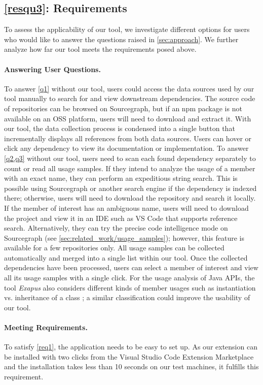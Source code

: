 \documentclass[a4paper,twoside]{article}
\begin{document}
\subsection{\ref{resqu3}: Requirements}
\label{sec:evaluation/resqu3}
To assess the applicability of our tool, we investigate different options for users who would like to answer the questions raised in \cref{sec:approach}.
We further analyze how far our tool meets the requirements posed above.

\paragraph{Answering User Questions.}
To answer \cref{q1} without our tool, users could access the data sources used by our tool manually to search for and view downstream dependencies.
The source code of repositories can be browsed on Sourcegraph, but if an npm package is not available on an OSS platform, users will need to download and extract it.
With our tool, the data collection process is condensed into a single button that incrementally displays all references from both data sources.
Users can hover or click any dependency to view its documentation or implementation.
To answer \cref{q2,q3} without our tool, users need to scan each found dependency separately to count or read all usage samples.
If they intend to analyze the usage of a member with an exact name, they can perform an expeditious string search.
This is possible using Sourcegraph or another search engine if the dependency is indexed there; otherwise, users will need to download the repository and search it locally.
If the member of interest has an ambiguous name, users will need to download the project and view it in an IDE such as VS Code that supports reference search.
Alternatively, they can try the precise code intelligence mode on Sourcegraph (see \cref{sec:related_work/usage_samples}); however, this feature is available for a few repositories only.
All usage samples can be collected automatically and merged into a single list within our tool.
Once the collected dependencies have been processed, users can select a member of interest and view all its usage samples with a single click.
For the usage analysis of Java APIs, the tool \emph{Exapus} also considers different kinds of member usages such as instantiation vs. inheritance of a class \cite{de2013multi}; a similar classification could improve the usability of our tool.

\paragraph{Meeting Requirements.}
To satisfy \cref{req1}, the application needs to be easy to set up.
As our extension can be installed with two clicks from the Visual Studio Code Extension Marketplace and the installation takes less than 10 seconds on our test machines, it fulfills this requirement.
\end{document}
